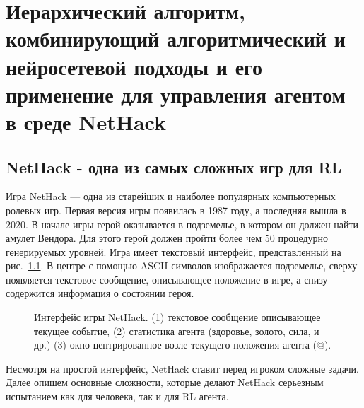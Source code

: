 \chapter{Иерархический алгоритм, комбинирующий алгоритмический и нейросетевой подходы и его применение для управления агентом в среде NetHack}\label{ch:ch4}

\section{NetHack - одна из самых сложных игр для RL}

Игра NetHack --- одна из старейших и наиболее популярных компьютерных ролевых игр. Первая версия игры появилась в 1987 году, а последняя вышла в 2020. В начале игры герой оказывается в подземелье, в котором он должен найти амулет Вендора. Для этого герой должен пройти более чем 50 процедурно генерируемых уровней. Игра имеет текстовый интерфейс, представленный на рис.~\ref{fig:nethack_map}. В центре с помощью ASCII символов изображается подземелье, сверху появляется текстовое сообщение, описывающее положение в игре, а снизу содержится информация о состоянии героя. 

\begin{figure}[ht]
\caption{Интерфейс игры NetHack. (1) текстовое сообщение описывающее текущее событие, (2) статистика агента (здоровье, золото, сила, и др.) (3) окно центрированное возле текущего положения агента (@).}
    \label{fig:nethack_map}
\end{figure}

Несмотря на простой интерфейс, NetHack ставит перед игроком сложные задачи. Далее опишем основные сложности, которые делают NetHack серьезным испытанием как для человека, так и для RL агента.

